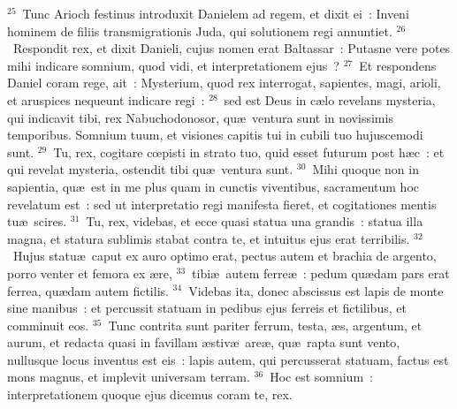 ${}^{25}$~Tunc Arioch festinus introduxit Danielem ad regem, et dixit ei~: Inveni hominem de filiis transmigrationis Juda, qui solutionem regi annuntiet.
${}^{26}$~Respondit rex, et dixit Danieli, cujus nomen erat Baltassar~: Putasne vere potes mihi indicare somnium, quod vidi, et interpretationem ejus~?
${}^{27}$~Et respondens Daniel coram rege, ait~: Mysterium, quod rex interrogat, sapientes, magi, arioli, et aruspices nequeunt indicare regi~:
${}^{28}$~sed est Deus in c\ae lo revelans mysteria, qui indicavit tibi, rex Nabuchodonosor, qu\ae\ ventura sunt in novissimis temporibus. Somnium tuum, et visiones capitis tui in cubili tuo hujuscemodi sunt.
${}^{29}$~Tu, rex, cogitare cœpisti in strato tuo, quid esset futurum post h\ae c~: et qui revelat mysteria, ostendit tibi qu\ae\ ventura sunt.
${}^{30}$~Mihi quoque non in sapientia, qu\ae\ est in me plus quam in cunctis viventibus, sacramentum hoc revelatum est~: sed ut interpretatio regi manifesta fieret, et cogitationes mentis tu\ae\ scires.
${}^{31}$~Tu, rex, videbas, et ecce quasi statua una grandis~: statua illa magna, et statura sublimis stabat contra te, et intuitus ejus erat terribilis.
${}^{32}$~Hujus statu\ae\ caput ex auro optimo erat, pectus autem et brachia de argento, porro venter et femora ex \ae re,
${}^{33}$~tibi\ae\ autem ferre\ae~: pedum qu\ae dam pars erat ferrea, qu\ae dam autem fictilis.
${}^{34}$~Videbas ita, donec abscissus est lapis de monte sine manibus~: et percussit statuam in pedibus ejus ferreis et fictilibus, et comminuit eos.
${}^{35}$~Tunc contrita sunt pariter ferrum, testa, \ae s, argentum, et aurum, et redacta quasi in favillam \ae stiv\ae\ are\ae , qu\ae\ rapta sunt vento, nullusque locus inventus est eis~: lapis autem, qui percusserat statuam, factus est mons magnus, et implevit universam terram.
${}^{36}$~Hoc est somnium~: interpretationem quoque ejus dicemus coram te, rex.


